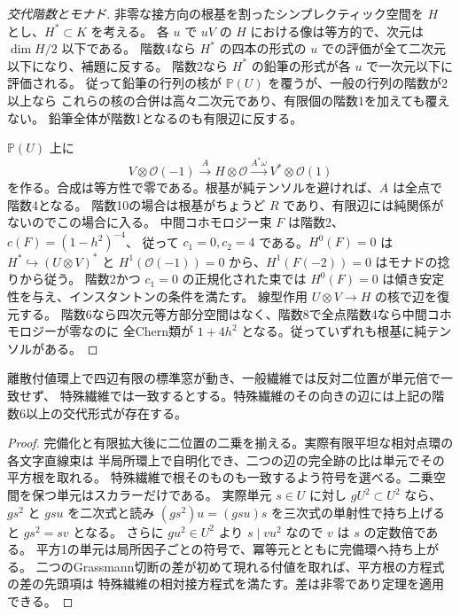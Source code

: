 \begin{proof}[交代階数とモナド]
非零な接方向の根基を割ったシンプレクティック空間を $H$ とし、$H^*\subset K$ を考える。
各 $u$ で $uV$ の $H$ における像は等方的で、次元は $\dim H/2$ 以下である。
階数4なら $H^*$ の四本の形式の $u$ での評価が全て二次元以下になり、補題に反する。
階数2なら $H^*$ の鉛筆の形式が各 $u$ で一次元以下に評価される。
従って鉛筆の行列の核が $\mathbb P(U)$ を覆うが、一般の行列の階数が2以上なら
これらの核の合併は高々二次元であり、有限個の階数1を加えても覆えない。
鉛筆全体が階数1となるのも有限辺に反する。

$\mathbb P(U)$ 上に
\[
  V\otimes\mathcal O(-1)\xrightarrow{A}H\otimes\mathcal O
       \xrightarrow{A^*\omega} V^*\otimes\mathcal O(1)
\]
を作る。合成は等方性で零である。根基が純テンソルを避ければ、$A$ は全点で階数4となる。
階数10の場合は根基がちょうど $R$ であり、有限辺には純関係がないのでこの場合に入る。
中間コホモロジー束 $F$ は階数2、$c(F)=(1-h^2)^{-4}$、
従って $c_1=0,c_2=4$ である。$H^0(F)=0$ は $H^*\hookrightarrow (U\otimes V)^*$ と
$H^1(\mathcal O(-1))=0$ から、$H^1(F(-2))=0$ はモナドの捻りから従う。
階数2かつ $c_1=0$ の正規化された束では $H^0(F)=0$ は傾き安定性を与え、インスタントンの条件を満たす。
線型作用 $U\otimes V\to H$ の核で辺を復元する。
階数6なら四次元等方部分空間はなく、階数8で全点階数4なら中間コホモロジーが零なのに
全Chern類が $1+4h^2$ となる。従っていずれも根基に純テンソルがある。
\end{proof}

\begin{corollary}\label{cor:opposite-square-root-collision}
離散付値環上で四辺有限の標準窓が動き、一般繊維では反対二位置が単元倍で一致せず、
特殊繊維では一致するとする。特殊繊維のその向きの辺には上記の階数6以上の交代形式が存在する。
\end{corollary}
\begin{proof}
完備化と有限拡大後に二位置の二乗を揃える。実際有限平坦な相対点環の各文字直線束は
半局所環上で自明化でき、二つの辺の完全跡の比は単元でその平方根を取れる。
特殊繊維で根そのものも一致するよう符号を選べる。二乗空間を保つ単元はスカラーだけである。
実際単元 $s\in U$ に対し $g U^2\subset U^2$ なら、$g s^2$ と $g s u$ を二次式と読み
$(g s^2)u=(g s u)s$ を三次式の単射性で持ち上げると $g s^2=s v$ となる。
さらに $g u^2\in U^2$ より $s\mid v u^2$ なので $v$ は $s$ の定数倍である。
平方1の単元は局所因子ごとの符号で、冪等元とともに完備環へ持ち上がる。
二つのGrassmann切断の差が初めて現れる付値を取れば、平方根の方程式の差の先頭項は
特殊繊維の相対接方程式を満たす。差は非零であり定理を適用できる。
\end{proof}

